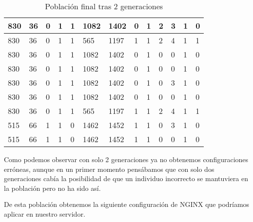 \begin{table}[H]
\begin{tabular}{|l|l|l|l|l|l|l|l|l|l|l|l|l|}
830        & 36         & 0          & 1          & 1          & 1082       & 1402       & 0          & 1          & 2           & 3           & 1           & 0           \\ \hline
830        & 36         & 0          & 1          & 1          & 565        & 1197       & 1          & 1          & 2           & 4           & 1           & 1           \\ \hline
830        & 36         & 0          & 1          & 1          & 1082       & 1402       & 0          & 1          & 0           & 0           & 1           & 0           \\ \hline
830        & 36         & 0          & 1          & 1          & 1082       & 1402       & 0          & 1          & 0           & 0           & 1           & 0           \\ \hline
830        & 36         & 0          & 1          & 1          & 1082       & 1402       & 0          & 1          & 0           & 3           & 1           & 0           \\ \hline
830        & 36         & 0          & 1          & 1          & 1082       & 1402       & 0          & 1          & 0           & 0           & 1           & 0           \\ \hline
830        & 36         & 0          & 1          & 1          & 565        & 1197       & 1          & 1          & 2           & 4           & 1           & 1           \\ \hline
515        & 66         & 1          & 1          & 0          & 1462       & 1452       & 1          & 1          & 0           & 3           & 1           & 0           \\ \hline
515        & 66         & 1          & 1          & 0          & 1462       & 1452       & 1          & 1          & 0           & 0           & 1           & 0           \\ \hline
\end{tabular}
\caption{Población final tras 2 generaciones}
\end{table}

Como podemos observar con solo 2 generaciones ya no obtenemos configuraciones erróneas, aunque en un primer momento pensábamos que con solo dos generaciones cabía la posibilidad de que un individuo incorrecto se mantuviera en la población pero no ha sido así.

\bigskip
De esta población obtenemos la siguiente configuración de NGINX que podríamos aplicar en nuestro servidor.

